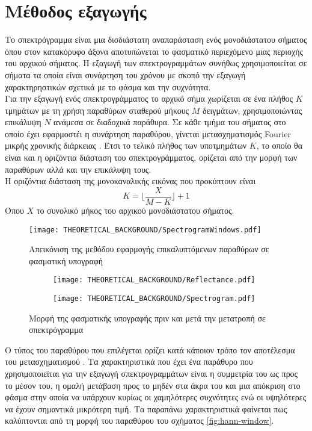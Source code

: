 \section{Μέθοδος εξαγωγής }
Το σπεκτρόγραμμα είναι μια δισδιάστατη αναπαράσταση ενός μονοδιάστατου σήματος όπου στον κατακόρυφο άξονα αποτυπώνεται το φασματικό περιεχόμενο μιας περιοχής του αρχικού σήματος. Η εξαγωγή των σπεκτρογραμμάτων συνήθως χρησιμοποιείται σε σήματα τα οποία είναι συνάρτηση του χρόνου με σκοπό την εξαγωγή χαρακτηρηστικών σχετικά με το φάσμα και την συχνότητα.\\
Για την εξαγωγή ενός σπεκτρογράμματος το αρχικό σήμα χωρίζεται σε ένα πλήθος $K$ τμημάτων με τη χρήση παραθύρων σταθερού μήκους $M$ δειγμάτων, χρησιμοποιώντας επικάλυψη $N$ ανάμεσα σε διαδοχικά παράθυρα. Σε κάθε τμήμα του σήματος στο οποίο έχει εφαρμοστέι η συνάρτηση παραθύρου, γίνεται μετασχηματισμός Fourier μικρής χρονικής διάρκειας . Έτσι το τελικό πλήθος των υποτμημάτων $K$, το οποίο θα είναι και η οριζόντια διάσταση του σπεκτρογράμματος, ορίζεται από την μορφή των παραθύρων αλλά και την επικάλυψη τους.\\
Η οριζόντια διάσταση της μονοκαναλικής εικόνας που προκύπτουν είναι 
$$K=\lfloor\frac{X}{M-K}\rfloor+1$$
Όπου $X$ το συνολικό μήκος του αρχικού μονοδιάστατου σήματος.

\begin{figure}[H]
  \begin{center}
    \texttt{[image: THEORETICAL\_BACKGROUND/SpectrogramWindows.pdf]}
    \caption{Απεικόνιση της μεθόδου εφαρμογής επικαλυπτόμενων παραθύρων σε φασματική υπογραφή}
  \end{center}
\end{figure}

\begin{figure}[H]
    \begin{subfigure}{0.5\textwidth}
        \texttt{[image: THEORETICAL\_BACKGROUND/Reflectance.pdf]}
    \end{subfigure}
    \begin{subfigure}{0.5\textwidth}
        \texttt{[image: THEORETICAL\_BACKGROUND/Spectrogram.pdf]}
    \end{subfigure}
    \caption{Μορφή της φασματικής υπογραφής πριν και μετά την μετατροπή σε σπεκτρόγραμμα}
\end{figure}

Ο τύπος του παραθύρου που επιλέγεται ορίζει κατά κάποιον τρόπο τον αποτέλεσμα του μετασχηματισμού . Τα χαρακτηριστικά που έχει ένα παράθυρο που χρησιμοποιείται για την εξαγωγή σπεκτρογραμμάτων είναι η συμμετρία του ως προς το μέσον του, η ομαλή μετάβαση προς το μηδέν στα άκρα του και μια απόκριση στο φάσμα στην οποία να υπάρχουν κυρίως οι χαμηλότερες συχνότητες ενώ οι υψηλότερες να έχουν σημαντικά μικρότερη τιμή. Τα παραπάνω χαρακτηριστικά φαίνεται πως καλύπτονται από τη μορφή του παραθύρου του σχήματος \ref{fig:hann-window}.

